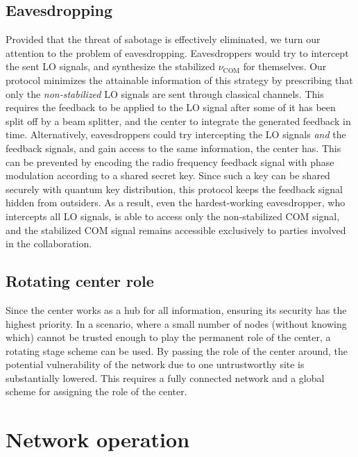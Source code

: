 \subsection{Eavesdropping}
Provided that the threat of sabotage is effectively eliminated, we turn our
attention to the problem of eavesdropping. Eavesdroppers would try to intercept
the sent LO signals, and synthesize the stabilized $\nu_\mathrm{COM}$ for themselves. Our
protocol minimizes the attainable information of this strategy by prescribing
that only the \emph{non-stabilized} LO signals are sent through classical
channels. This requires the feedback to be applied to the LO signal after some
of it has been split off by a beam splitter, and the center to integrate the
generated feedback in time. Alternatively, eavesdroppers could try intercepting
the LO signals \emph{and} the feedback signals, and gain access to the same
information, the center has. This can be prevented by encoding the radio
frequency feedback signal with phase modulation according to a shared secret
key. Since such a key can be shared securely with quantum key distribution, this protocol keeps the feedback signal hidden from outsiders. As a
result, even the hardest-working eavesdropper, who intercepts all LO signals, is
able to access only the non-stabilized COM signal, and the stabilized COM signal
remains accessible exclusively to parties involved in the collaboration.

\subsection{Rotating center role}
Since the center works as  a hub for all information, ensuring
its security has the highest priority. In a scenario,  where 
a small number of nodes (without knowing which) cannot be 
trusted enough to play the permanent role of the center, a rotating stage
scheme can be used. By passing the role of the center around, the
potential vulnerability of the network due to one untrustworthy site is
substantially lowered. This requires a fully connected
network and a global scheme for assigning the role of the center.


\section{Network operation}

